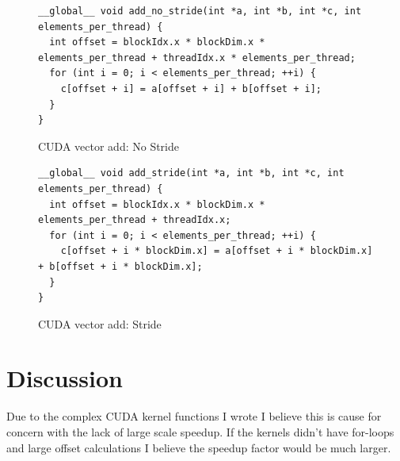 \documentclass[letterpaper,twocolumn]{article}
\begin{document}
\begin{figure}
\begin{lstlisting}
__global__ void add_no_stride(int *a, int *b, int *c, int elements_per_thread) {
  int offset = blockIdx.x * blockDim.x * elements_per_thread + threadIdx.x * elements_per_thread;
  for (int i = 0; i < elements_per_thread; ++i) {
    c[offset + i] = a[offset + i] + b[offset + i];
  }
}
\end{lstlisting}
\caption{CUDA vector add: No Stride}
\label{fig:nostride}
\end{figure}

\begin{figure}
\begin{lstlisting}
__global__ void add_stride(int *a, int *b, int *c, int elements_per_thread) {
  int offset = blockIdx.x * blockDim.x * elements_per_thread + threadIdx.x;
  for (int i = 0; i < elements_per_thread; ++i) {
    c[offset + i * blockDim.x] = a[offset + i * blockDim.x] + b[offset + i * blockDim.x];
  }
}
\end{lstlisting}
\caption{CUDA vector add: Stride}
\label{fig:stride}
\end{figure}
\section{Discussion}
Due to the complex CUDA kernel functions I wrote I believe this is cause for concern with the lack of large scale speedup. If the kernels didn't have for-loops and large offset calculations I believe the speedup factor would be much larger.
\end{document}
